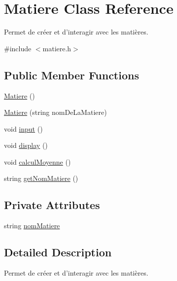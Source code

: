 \hypertarget{class_matiere}{\section{Matiere Class Reference}
\label{class_matiere}
}


Permet de créer et d'interagir avec les matières.  




{\ttfamily \#include $<$matiere.\+h$>$}

\subsection*{Public Member Functions}
\begin{DoxyCompactItemize}
\item 
\hyperlink{class_matiere_a0d9dbc35cd0221225366e2ba189c4b42}{Matiere} ()
\item 
\hyperlink{class_matiere_a3a44d93c8078dc274999e7017b27075b}{Matiere} (string nom\+De\+La\+Matiere)
\item 
void \hyperlink{class_matiere_a314ae9fc824027e032c9c02faf3ccc8f}{input} ()
\item 
void \hyperlink{class_matiere_a83c7ad70642d1c15c2b43c5e6c2823d2}{display} ()
\item 
void \hyperlink{class_matiere_a270e13c81b9ad19c42c2128f983af115}{calcul\+Moyenne} ()
\item 
string \hyperlink{class_matiere_a5a31f5b5b20f39cdbf6136cde25ecd31}{get\+Nom\+Matiere} ()
\end{DoxyCompactItemize}
\subsection*{Private Attributes}
\begin{DoxyCompactItemize}
\item 
string \hyperlink{class_matiere_a701728c9283e82fd270a91a8eb541917}{nom\+Matiere}
\end{DoxyCompactItemize}


\subsection{Detailed Description}
Permet de créer et d'interagir avec les matières. 

